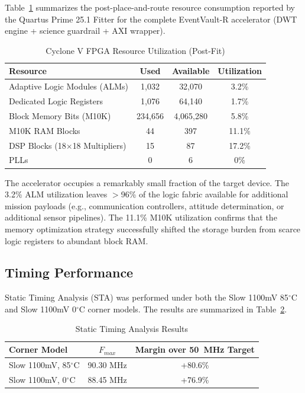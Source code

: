 \documentclass[conference]{IEEEtran}
\begin{document}
Table~\ref{tab:utilization} summarizes the post-place-and-route resource consumption reported by the Quartus Prime 25.1 Fitter for the complete EventVault-R accelerator (DWT engine + science guardrail + AXI wrapper).

\begin{table}[ht]
\centering
\caption{Cyclone V FPGA Resource Utilization (Post-Fit)}
\label{tab:utilization}
\begin{tabular}{@{}lccc@{}}
\toprule
\textbf{Resource} & \textbf{Used} & \textbf{Available} & \textbf{Utilization} \\ \midrule
Adaptive Logic Modules (ALMs) & 1,032 & 32,070 & 3.2\% \\
Dedicated Logic Registers & 1,076 & 64,140 & 1.7\% \\
Block Memory Bits (M10K) & 234,656 & 4,065,280 & 5.8\% \\
M10K RAM Blocks & 44 & 397 & 11.1\% \\
DSP Blocks (18$\times$18 Multipliers) & 15 & 87 & 17.2\% \\
PLLs & 0 & 6 & 0\% \\ \bottomrule
\end{tabular}
\end{table}

The accelerator occupies a remarkably small fraction of the target device. The 3.2\% ALM utilization leaves $>$96\% of the logic fabric available for additional mission payloads (e.g., communication controllers, attitude determination, or additional sensor pipelines). The 11.1\% M10K utilization confirms that the memory optimization strategy successfully shifted the storage burden from scarce logic registers to abundant block RAM.

\subsection{Timing Performance}

Static Timing Analysis (STA) was performed under both the Slow 1100mV 85$^\circ$C and Slow 1100mV 0$^\circ$C corner models. The results are summarized in Table~\ref{tab:timing}.

\begin{table}[ht]
\centering
\caption{Static Timing Analysis Results}
\label{tab:timing}
\begin{tabular}{@{}lcc@{}}
\toprule
\textbf{Corner Model} & \textbf{$F_{max}$} & \textbf{Margin over 50~MHz Target} \\ \midrule
Slow 1100mV, 85$^\circ$C & 90.30 MHz & +80.6\% \\
Slow 1100mV, 0$^\circ$C & 88.45 MHz & +76.9\% \\ \bottomrule
\end{tabular}
\end{table}
\end{document}
